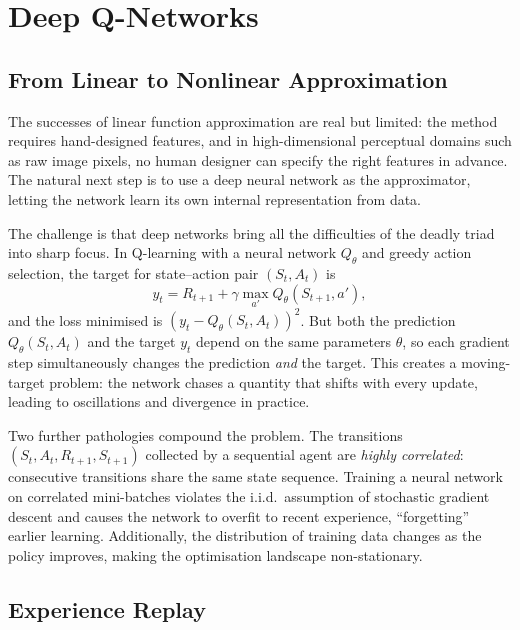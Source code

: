 \section{Deep Q-Networks}
\label{sec:dqn}

\subsection{From Linear to Nonlinear Approximation}

The successes of linear function approximation are real but limited: the method requires
hand-designed features, and in high-dimensional perceptual domains such as raw image pixels, no
human designer can specify the right features in advance.  The natural next step is to use a
deep neural network as the approximator, letting the network learn its
own internal representation from data.

The challenge is that deep networks bring all the difficulties of the deadly triad into sharp
focus.  In Q-learning with a neural network $Q_\theta$ and greedy action selection, the target for
state--action pair $(S_t, A_t)$ is
\begin{equation}
\label{eq:naive-deep-q-target}
y_t = R_{t+1} + \gamma \max_{a'} Q_\theta(S_{t+1}, a'),
\end{equation}
and the loss minimised is $(y_t - Q_\theta(S_t, A_t))^2$.  But both the prediction $Q_\theta(S_t, A_t)$
and the target $y_t$ depend on the same parameters $\theta$, so each gradient step simultaneously
changes the prediction \emph{and} the target.  This creates a moving-target problem: the network
chases a quantity that shifts with every update, leading to oscillations and divergence in practice.

Two further pathologies compound the problem.  The transitions $(S_t, A_t, R_{t+1}, S_{t+1})$
collected by a sequential agent are \emph{highly correlated}: consecutive transitions share the
same state sequence.  Training a neural network on correlated mini-batches violates the i.i.d.\
assumption of stochastic gradient descent and causes the network to overfit to recent experience,
``forgetting'' earlier learning.  Additionally, the distribution of training data changes as the
policy improves, making the optimisation landscape non-stationary.

\subsection{Experience Replay}
\label{subsec:experience-replay}

